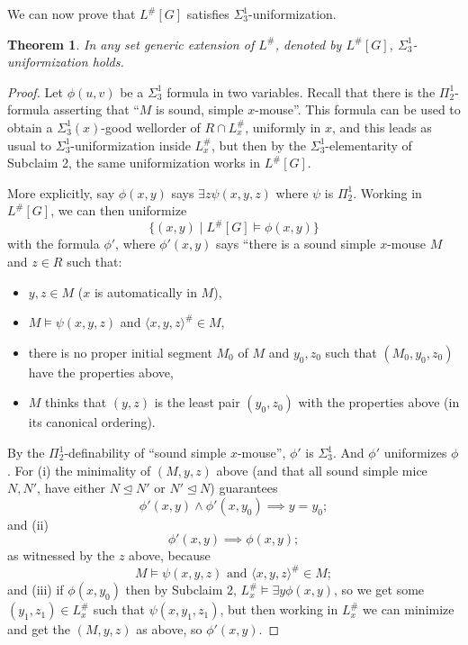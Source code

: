 \documentclass{article}
\theoremstyle{plain}
\newtheorem{theorem}{Theorem}[section]
\theoremstyle{definition}
\newcommand{\Lsharp}{L^{\#}}
\begin{document}
We can now prove that $\Lsharp[G]$ satisfies ${\Sigma}^1_3$-uniformization. 
\begin{theorem}
In any set generic extension of $L^{\#}$, denoted by $L^{\#}[G]$, $\Sigma^1_3$-uniformization holds.
\end{theorem}
\begin{proof}


Let $\phi(u, v)$ be a ${\Sigma}^1_3$ formula in two variables. Recall that there is the $\Pi^1_2$-formula asserting that ``$M$ is sound, simple $x$-mouse''. This formula can be used to obtain a ${\Sigma}^1_3(x)$-good wellorder of $R \cap \Lsharp_x$, uniformly in $x$, and this leads as usual to ${\Sigma}^1_3$-uniformization inside $\Lsharp_x$, but then by the $\Sigma^1_3$-elementarity of Subclaim 2, the same uniformization works in $\Lsharp[G]$.

More explicitly, say $\phi(x, y)$ says $\exists z \psi(x, y, z)$ where $\psi$ is $\Pi^1_2$. Working in $\Lsharp[G]$, we can then uniformize
$$\{(x, y) \mid \Lsharp[G] \models \phi(x, y)\}$$
with the formula $\phi'$, where $\phi'(x, y)$ says ``there is a sound simple $x$-mouse $M$ and $z \in R$ such that:
\begin{itemize}
    \item $y, z \in M$ ($x$ is automatically in $M$),
    \item $M \models \psi(x, y, z)$ and $\langle x, y, z \rangle^\# \in M$,
    \item there is no proper initial segment $M_0$ of $M$ and $y_0, z_0$ such that $(M_0, y_0, z_0)$ have the properties above,
    \item $M$ thinks that $(y, z)$ is the least pair $(y_0, z_0)$ with the properties above (in its canonical ordering).
\end{itemize}
By the $\Pi^1_2$-definability of ``sound simple $x$-mouse'', $\phi'$ is ${\Sigma}^1_3$. And $\phi'$ uniformizes $\phi$. For (i) the minimality of $(M, y, z)$ above (and that all sound simple mice $N, N'$, have either $N \unlhd N'$ or $N' \unlhd N$) guarantees
$$\phi'(x, y) \land \phi'(x, y_0) \implies y = y_0;$$
and (ii)
$$\phi'(x, y) \implies \phi(x, y);$$
as witnessed by the $z$ above, because
$$M \models \psi(x, y, z) \text{ and } \langle x, y, z \rangle^\# \in M;$$
and (iii) if $\phi(x, y_0)$ then by Subclaim 2, $\Lsharp_x \models \exists y \phi(x, y)$, so we get some $(y_{1}, z_{1}) \in \Lsharp_x$ such that $\psi(x, y_{1}, z_{1})$, but then working in $\Lsharp_x$ we can minimize and get the $(M, y, z)$ as above, so $\phi'(x, y)$.
\end{proof}
\end{document}
